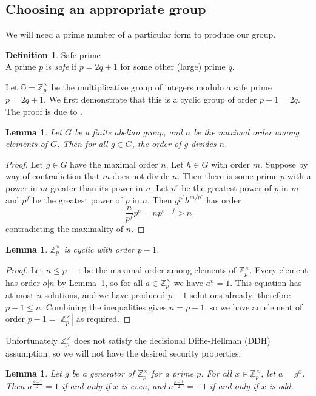 \documentclass[11pt,twoside,a4paper]{article}
\newtheorem{lemma}[theorem]{Lemma}
\theoremstyle{definition}
\newtheorem{definition}{Definition}[section]
\begin{document}
\subsection{Choosing an appropriate group}
We will need a prime number of a particular form to produce our group.
\begin{definition}{Safe prime}\\
    A prime \(p\) is \textit{safe} if \(p=2q+1\) for some other (large) prime \(q\).
\end{definition}
Let \(\mathbb{G}=\mathbb{Z}^\times_p\) be the multiplicative group of integers modulo a safe prime \(p=2q+1\). We first demonstrate that this is a cyclic group of order \(p-1=2q\). The proof is due to \cite{cyclicity}.
\begin{lemma}\label{lem-order-divides}
    Let \(G\) be a finite abelian group, and \(n\) be the maximal order among elements of \(G\). Then for all \(g\in G\), the order of \(g\) divides \(n\).
\end{lemma}
\begin{proof}
    Let \(g\in G\) have the maximal order \(n\). Let \(h\in G\) with order \(m\). Suppose by way of contradiction that \(m\) does not divide \(n\). Then there is some prime \(p\) with a power in \(m\) greater than its power in \(n\). Let \(p^e\) be the greatest power of \(p\) in \(m\) and \(p^f\) be the greatest power of \(p\) in \(n\). Then \(g^{p^f}h^{m/p^e}\) has order
    \[\frac{n}{p^f}p^e=np^{e-f}>n\]
    contradicting the maximality of \(n\).
\end{proof}
\begin{lemma}
    \(\mathbb{Z}^\times_p\) is cyclic with order \(p-1\).
\end{lemma}
\begin{proof}
    Let \(n\leq p-1\) be the maximal order among elements of \(\mathbb{Z}^\times_p\). Every element has order \(o\vert n\) by Lemma~\ref{lem-order-divides}, so for all \(a\in\mathbb{Z}^\times_p\) we have \(a^n=1\). This equation has at most \(n\) solutions, and we have produced \(p-1\) solutions already; therefore \(p-1\leq n\).
    Combining the inequalities gives \(n=p-1\), so we have an element of order \(p-1=|\mathbb{Z}^\times_p|\) as required.
\end{proof}
Unfortunately \(\mathbb{Z}^\times_p\) does not satisfy the decisional Diffie-Hellman (DDH) assumption, so we will not have the desired security properties:
\begin{lemma}\label{lem-parity}
    Let \(g\) be a generator of \(\mathbb{Z}^\times_p\) for a prime \(p\). For all \(x\in\mathbb{Z}^\times_p\), let \(a=g^x\). Then \(a^{\frac{p-1}{2}} = 1\) if and only if \(x\) is even, and \(a^{\frac{p-1}{2}} = -1\) if and only if \(x\) is odd.
\end{lemma}
\end{document}
